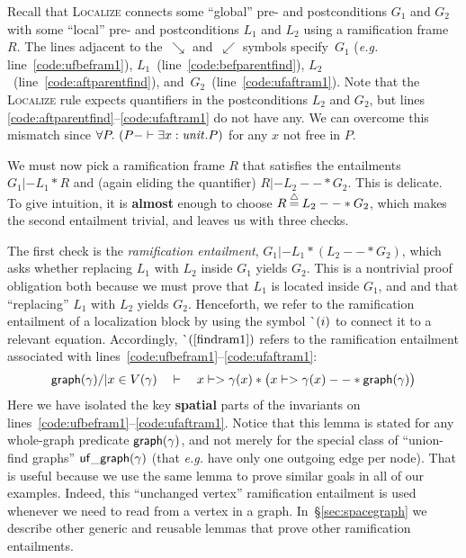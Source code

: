 Recall that \textsc{Localize} connects some ``global'' pre- and postconditions $G_1$ and $G_2$
with some ``local'' pre- and postconditions $L_1$ and $L_2$ using a ramification
frame $R$.
The lines adjacent to
the~$\searrow$ and~$\swarrow$ symbols specify~$G_1$ (\emph{e.g.} line~\ref{code:ufbefram1}),
$L_1$~(line~\ref{code:befparentfind}),
$L_2$~(line~\ref{code:aftparentfind}), and~$G_2$~(line~\ref{code:ufaftram1}).
Note that the \textsc{Localize} rule expects quantifiers in the postconditions $L_2$ and $G_2$,
but lines \ref{code:aftparentfind}--\ref{code:ufaftram1} do not have any.  We can overcome
this mismatch since $\forall P.~ (P -|- \exists x : \mathit{unit}.P)$ for any $x$ not free in $P$. %


We must now pick a ramification frame $R$ that satisfies
the entailments $G_1 |- L_1 * R$ and (again eliding the quantifier) $R |- L_2 --* G_2$.
This is delicate.  To give intuition, it is \textbf{almost} enough to 
choose
$R \mathbin{\stackrel{\triangle}{=}} L_2 --* G_2$, which makes the second entailment trivial, and leaves us with three checks.

The first check is the \emph{ramification entailment}, $G_1 |- L_1 * (L_2 --* G_2)$,
which asks whether replacing $L_1$ with $L_2$ inside $G_1$ yields $G_2$.
This is a nontrivial proof obligation both because
we must prove that $L_1$ is located inside $G_1$, and and that
``replacing'' $L_1$ with $L_2$ yields $G_2$.
Henceforth, we refer to the ramification entailment of a localization block by
using the symbol $\lightning(i)$ to connect it to a relevant equation.  Accordingly, $\lightning(\ref{findram1})$ refers to the ramification entailment
associated with lines~\ref{code:ufbefram1}--\ref{code:ufaftram1}:
\begin{equation}
\label{findram1}
\mathsf{graph}(\gamma) /| x \in V(\gamma) \quad |- \quad x |-> \gamma(x) * \big(x |-> \gamma(x) --* \mathsf{graph}(\gamma)\big)
\end{equation}
Here we have isolated the key \textbf{spatial} parts of the invariants on lines~\ref{code:ufbefram1}--\ref{code:ufaftram1}.  Notice that this lemma is stated for any whole-graph predicate $\mathsf{graph}(\gamma)$, and not merely for the special class of ``union-find graphs'' $\mathsf{uf\_graph}(\gamma)$ (that \emph{e.g.} have only one outgoing edge per node).  That is useful because we use the same lemma to prove similar goals in all of our examples.
Indeed, this ``unchanged vertex'' ramification entailment is used whenever we need to read from a vertex in a graph.  In~\S\ref{sec:spacegraph} we describe other generic and reusable lemmas that prove other ramification entailments.

